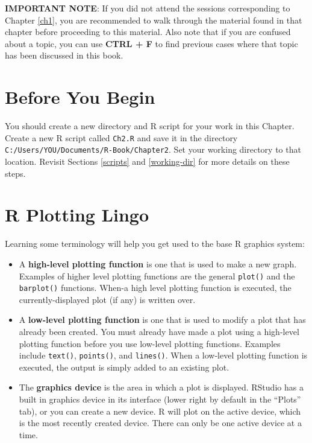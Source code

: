 \documentclass[]{book}
\providecommand{\tightlist}{%
  \setlength{\itemsep}{0pt}\setlength{\parskip}{0pt}}
\theoremstyle{definition}
\theoremstyle{definition}
\theoremstyle{definition}
\theoremstyle{remark}
\begin{document}
\textbf{IMPORTANT NOTE}: If you did not attend the sessions
corresponding to Chapter \ref{ch1}, you are recommended to walk through
the material found in that chapter before proceeding to this material.
Also note that if you are confused about a topic, you can use
\textbf{CTRL + F} to find previous cases where that topic has been
discussed in this book.

\section*{Before You Begin}\label{before-you-begin-1}

You should create a new directory and R script for your work in this
Chapter. Create a new R script called \texttt{Ch2.R} and save it in the
directory \texttt{C:/Users/YOU/Documents/R-Book/Chapter2}. Set your
working directory to that location. Revisit Sections \ref{scripts} and
\ref{working-dir} for more details on these steps.

\section{R Plotting Lingo}\label{r-plotting-lingo}

Learning some terminology will help you get used to the base R graphics
system:

\begin{itemize}
\tightlist
\item
  A \textbf{high-level plotting function} is one that is used to make a
  new graph. Examples of higher level plotting functions are the general
  \texttt{plot()} and the \texttt{barplot()} functions. When-a high
  level plotting function is executed, the currently-displayed plot (if
  any) is written over.
\item
  A \textbf{low-level plotting function} is one that is used to modify a
  plot that has already been created. You must already have made a plot
  using a high-level plotting function before you use low-level plotting
  functions. Examples include \texttt{text()}, \texttt{points()}, and
  \texttt{lines()}. When a low-level plotting function is executed, the
  output is simply added to an existing plot.
\item
  The \textbf{graphics device} is the area in which a plot is displayed.
  RStudio has a built in graphics device in its interface (lower right
  by default in the ``Plots'' tab), or you can create a new device. R
  will plot on the active device, which is the most recently created
  device. There can only be one active device at a time.
\end{itemize}
\end{document}
